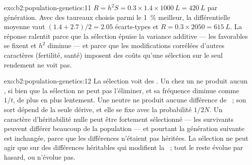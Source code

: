 \begin{solution}{exo:b2:population-genetics:11}
$R = h^{2}S = 0.3\times 1.4\times \qty{1000}{L} = \qty{420}{L}$ par
génération. Avec des taureaux choisis parmi le \qty{1}{\%} meilleur, la
différentielle moyenne vaut $(1.4 + 2.7)/2 = 2.05$ écarts-types et $R =
0.3\times 2050 = \qty{615}{L}$. La réponse ralentit parce que la
sélection épuise la variance additive --- les  favorables se
fixent et $h^{2}$ diminue --- et parce que les modifications corrélées
d'autres caractères (fertilité, santé) imposent des coûts qu'une
sélection sur le seul rendement ne voit pas.
\end{solution}

\begin{solution}{exo:b2:population-genetics:12}
La sélection voit des . Un   chez un
 ne produit aucun , si bien que la sélection ne
peut pas l'éliminer, et sa fréquence diminue comme $1/t$, de plus en
plus lentement. Une  neutre ne produit aucune différence de
~; son sort dépend de la seule dérive, et elle se fixe
avec la probabilité $1/2N$. Un caractère d'héritabilité nulle peut être
fortement sélectionné --- les survivants peuvent différer beaucoup de la
population --- et pourtant la génération suivante est inchangée, parce
que les différences n'étaient pas héritées. La sélection ne peut agir que
sur des différences héritables qui modifient la ~; tout
le reste évolue par hasard, ou n'évolue pas.
\end{solution}

